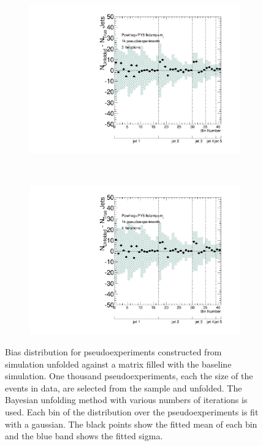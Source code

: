 \begin{figure}
\begin{subfigure}[]{0.5\textwidth}
\includegraphics[width=\textwidth]{fig/Stress/110404atlfast/Bias3Iterations.pdf}
\end{subfigure}
~
\begin{subfigure}[]{0.5\textwidth}
\includegraphics[width=\textwidth]{fig/Stress/110404atlfast/Bias4Iterations.pdf}
\end{subfigure}
\caption{Bias distribution for pseudoexperiments constructed from \newline \hdamp~ simulation unfolded against a matrix filled with the baseline simulation. One thousand pseudoexperiments, each the size of the events in data, are selected from the sample and unfolded. The Bayesian unfolding method with various numbers of iterations is used. Each bin of the distribution over the pseudoexperiments is fit with a gaussian. The black points show the fitted mean of each bin and the blue band shows the fitted sigma. }
\label{fig:hdampbias}
\end{figure}
